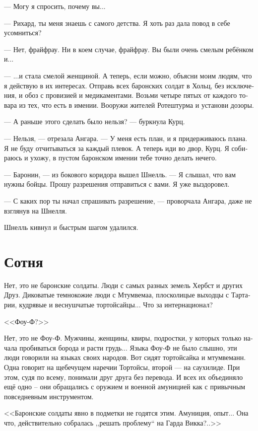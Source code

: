 \documentclass[a4paper,12pt,fleqn]{book}\usepackage{cooltooltips}\usepackage{polyglossia}\setdefaultlanguage[babelshorthands=true]{russian}\setotherlanguage{english}\defaultfontfeatures{Ligatures=TeX,Mapping=tex-text} \usepackage{xcolor}\definecolor{lightgray}{HTML}{bbbbbb}\color{lightgray}\newcommand{\ml}[3]{\textenglish{\textcolor{black}{#3}}}
\begin{document}
--- Могу я спросить, почему вы...

--- Рихард, ты меня знаешь с самого детства.
Я хоть раз дала повод в себе усомниться?

--- Нет, фрайфрау.
Ни в коем случае, фрайфрау.
Вы были очень смелым ребёнком и...

--- ...и стала смелой женщиной.
А теперь, если можно, объясни моим людям, что я действую в их интересах.
Отправь всех баронских солдат в Хольц, без исключения, и обоз с провизией и медикаментами.
Возьми четыре пятых от каждого товара из тех, что есть в имении.
Вооружи жителей Ротештурма и установи дозоры.

--- А раньше этого сделать было нельзя? --- буркнула Курц.

--- Нельзя, --- отрезала Ангара.
--- У меня есть план, и я придерживаюсь плана.
Я не буду отчитываться за каждый плевок.
А теперь иди во двор, Курц.
Я собираюсь и ухожу, в пустом баронском имении тебе точно делать нечего.

--- Баронин, --- из бокового коридора вышел Шнелль.
--- Я слышал, что вам нужны бойцы.
Прошу разрешения отправиться с вами.
Я уже выздоровел.

--- С каких пор ты начал спрашивать разрешение, --- проворчала Ангара, даже не взглянув на Шнелля.

Шнелль кивнул и быстрым шагом удалился.

\section{Сотня}

Нет, это не баронские солдаты.
Люди с самых разных земель Хербст и других Друз.
Диковатые темнокожие люди с Мтумвемаа, плосколицые выходцы с Тартарии, кудрявые и веснушчатые тортойсайцы...
Что за интернационал?

<<Фоу-Ф?>>

Нет, это не Фоу-Ф.
Мужчины, женщины, квиры, подростки, у которых только начала пробиваться борода и расти грудь...
Языка Фоу-Ф не было слышно, эти люди говорили на языках своих народов.
Вот сидят тортойсайка и мтумвеманн.
Одна говорит на щебечущем наречии Тортойсы, второй --- на саухилиде.
При этом, судя по всему, понимали друг друга без перевода.
И всех их объединяло ещё одно -- они обращались с оружием и военной амуницией как с привычным повседневным инструментом.

<<Баронские солдаты явно в подметки не годятся этим.
Амуниция, опыт...
Она что, действительно собралась ,,решать проблему`` на Гарда Викка?..>>
\end{document}
